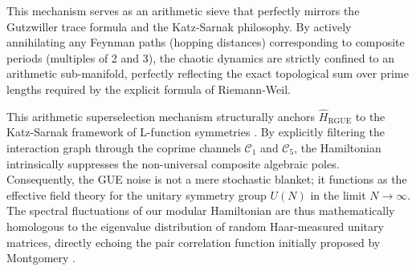 \documentclass[aps,prl,preprint,superscriptaddress,floatfix]{revtex4-2}
\begin{document}
This mechanism serves as an arithmetic sieve that perfectly mirrors the Gutzwiller trace formula and the Katz-Sarnak philosophy. By actively annihilating any Feynman paths (hopping distances) corresponding to composite periods (multiples of 2 and 3), the chaotic dynamics are strictly confined to an arithmetic sub-manifold, perfectly reflecting the exact topological sum over prime lengths required by the explicit formula of Riemann-Weil.

This arithmetic superselection mechanism structurally anchors $\hat{H}_{\text{RGUE}}$ to the Katz-Sarnak framework of L-function symmetries \cite{KatzSarnak1999}. By explicitly filtering the interaction graph through the coprime channels $\mathcal{C}_1$ and $\mathcal{C}_5$, the Hamiltonian intrinsically suppresses the non-universal composite algebraic poles. Consequently, the GUE noise is not a mere stochastic blanket; it functions as the effective field theory for the unitary symmetry group $U(N)$ in the limit $N \to \infty$. The spectral fluctuations of our modular Hamiltonian are thus mathematically homologous to the eigenvalue distribution of random Haar-measured unitary matrices, directly echoing the pair correlation function initially proposed by Montgomery \cite{Montgomery1973}.
\end{document}
